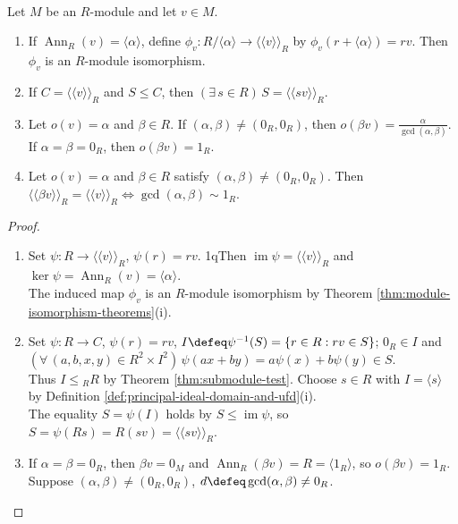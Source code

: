 \begin{theorem} \label{thm:cyclic-modules-over-pid} \\
Let $M$ be an $R$-module and let $v\in M$.
\begin{enumerate}[label=(\roman*)]
\setlength{\itemsep}{0pt}
\item If $\operatorname{Ann}_R(v)=\langle\alpha\rangle$, define $\phi_v:R/\langle\alpha\rangle\to\langle\!\langle v\rangle\!\rangle_R$ by $\phi_v(r+\langle\alpha\rangle)=rv$. Then $\phi_v$ is an $R$-module isomorphism.
\item If $C=\langle\!\langle v\rangle\!\rangle_R$ and $S\leq C$, then $(\exists\,s\in R)\,S=\langle\!\langle sv\rangle\!\rangle_R$.
\item Let $o(v)=\alpha$ and $\beta\in R$. If $(\alpha,\beta)\neq(0_R,0_R)$, then $o(\beta v)=\frac{\alpha}{\gcd(\alpha,\beta)}$. If $\alpha=\beta=0_R$, then $o(\beta v)=1_R$.
\item Let $o(v)=\alpha$ and $\beta\in R$ satisfy $(\alpha,\beta)\neq(0_R,0_R)$. Then $\langle\!\langle\beta v\rangle\!\rangle_R=\langle\!\langle v\rangle\!\rangle_R\Longleftrightarrow\gcd(\alpha,\beta)\sim1_R$.
\end{enumerate}
\begin{proof}
\begin{enumerate}[label=(\roman*)]
\setlength{\itemsep}{0pt}
\item[$(i)$] Set $\psi:R\to\langle\!\langle v\rangle\!\rangle_R$, $\psi(r)=rv$. 1qThen $\operatorname{im}\psi=\langle\!\langle v\rangle\!\rangle_R$ and $\ker\psi=\operatorname{Ann}_R(v)=\langle\alpha\rangle$.\\
The induced map $\phi_v$ is an $R$-module isomorphism by Theorem \ref{thm:module-isomorphism-theorems}(i).
\item[$(ii)$] Set $\psi:R\to C$, $\psi(r)=rv$, $I\defeq\psi^{-1}(S)=\{r\in R:rv\in S\}$; $0_R\in I$ and $(\forall\,(a,b,x,y)\in R^2\times I^2)\,\psi(ax+by)=a\psi(x)+b\psi(y)\in S$.\\
Thus $I\leq{}_R R$ by Theorem \ref{thm:submodule-test}. Choose $s\in R$ with $I=\langle s\rangle$ by Definition \ref{def:principal-ideal-domain-and-ufd}(i).\\
The equality $S=\psi(I)$ holds by $S\leq\operatorname{im}\psi$, so $S=\psi(Rs)=R(sv)=\langle\!\langle sv\rangle\!\rangle_R$.
\item[$(iii)$] If $\alpha=\beta=0_R$, then $\beta v=0_M$ and $\operatorname{Ann}_R(\beta v)=R=\langle1_R\rangle$, so $o(\beta v)=1_R$. Suppose $(\alpha,\beta)\neq(0_R,0_R)$,  $d\defeq\gcd(\alpha,\beta)\neq0_R$.\\

\end{enumerate}
\end{proof}
\end{theorem}
